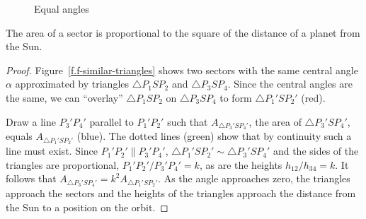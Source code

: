 \begin{figure}
\begin{minipage}{.48\textwidth}
\begin{center}
\caption{Equal angles}\label{f.f-equal-angles}
\end{center}
\end{minipage}
\end{figure}

\begin{theorem}\label{thm.f-proportional}
The area of a sector is proportional to the square of the distance of a planet from the Sun.
\end{theorem}

\begin{proof}
Figure~\ref{f.f-similar-triangles} shows two sectors with the same central angle $\alpha$ approximated by triangles $\triangle P_1SP_2$ and $\triangle P_3SP_4$. Since the central angles are the same, we can ``overlay'' $\triangle P_1SP_2$ on $\triangle P_3SP_4$ to form $\triangle P_1'SP_2'$ (red).

Draw a line $P_3'P_4'$ parallel to $P_1'P_2'$ such that $A_{\triangle P_3'SP_4'}$, the area of $\triangle P_3'SP_4'$, equals $A_{\triangle P_1'SP_2'}$ (blue). The dotted lines (green) show that by continuity such a line must exist. Since $P_1'P_2'\parallel P_3'P_4'$, $\triangle P_1'SP_2'\sim \triangle P_3'SP_4'$ and the sides of the triangles are proportional, $P_1'P_2'/P_3'P_4' = k$, as are the heights $h_{12}/h_{34}=k$. It follows that $A_{\triangle P_3'SP_4'}=k^2 A_{\triangle P_1'SP_2'}$. As the angle approaches zero, the triangles approach the sectors and the heights of the triangles approach the distance from the Sun to a position on the orbit.
\hqed 
\end{proof}

